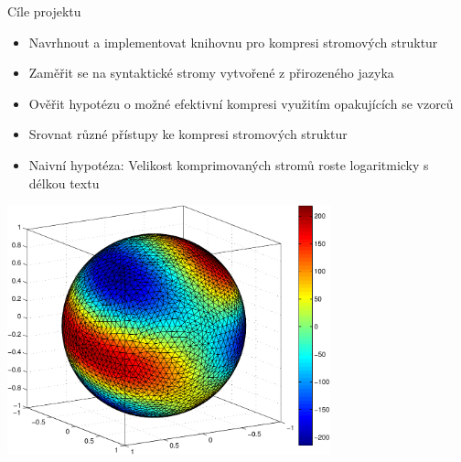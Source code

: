 \documentclass[lualatex,hyperref={pdfencoding=auto}]{beamer}
\begin{document}
\begin{frame}{Cíle projektu}
  \begin{itemize}
    \item Navrhnout a implementovat knihovnu pro kompresi stromových struktur
    \item Zaměřit se na syntaktické stromy vytvořené z přirozeného jazyka
    \item Ověřit hypotézu o možné efektivní kompresi využitím opakujících se vzorců
    \item Srovnat různé přístupy ke kompresi stromových struktur
    \item<2-> Naivní hypotéza: Velikost komprimovaných stromů roste logaritmicky s délkou textu
  \end{itemize}
  \vspace{5mm}
  \begin{center}
    \includegraphics[width=0.7\textwidth]{fig/sphere_mix_real.pdf}
  \end{center}
\end{frame}
\end{document}
